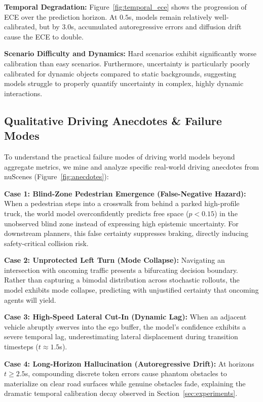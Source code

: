 \textbf{Temporal Degradation:} Figure~\ref{fig:temporal_ece} shows the progression of ECE over the prediction horizon. At $0.5$s, models remain relatively well-calibrated, but by $3.0$s, accumulated autoregressive errors and diffusion drift cause the ECE to double.

\textbf{Scenario Difficulty and Dynamics:} Hard scenarios exhibit significantly worse calibration than easy scenarios. Furthermore, uncertainty is particularly poorly calibrated for dynamic objects compared to static backgrounds, suggesting models struggle to properly quantify uncertainty in complex, highly dynamic interactions.

\subsection{Qualitative Driving Anecdotes \& Failure Modes}
\label{sec:anecdotes}
To understand the practical failure modes of driving world models beyond aggregate metrics, we mine and analyze specific real-world driving anecdotes from nuScenes (Figure~\ref{fig:anecdotes}):

\textbf{Case 1: Blind-Zone Pedestrian Emergence (False-Negative Hazard):} When a pedestrian steps into a crosswalk from behind a parked high-profile truck, the world model overconfidently predicts free space ($p < 0.15$) in the unobserved blind zone instead of expressing high epistemic uncertainty. For downstream planners, this false certainty suppresses braking, directly inducing safety-critical collision risk.

\textbf{Case 2: Unprotected Left Turn (Mode Collapse):} Navigating an intersection with oncoming traffic presents a bifurcating decision boundary. Rather than capturing a bimodal distribution across stochastic rollouts, the model exhibits mode collapse, predicting with unjustified certainty that oncoming agents will yield.

\textbf{Case 3: High-Speed Lateral Cut-In (Dynamic Lag):} When an adjacent vehicle abruptly swerves into the ego buffer, the model's confidence exhibits a severe temporal lag, underestimating lateral displacement during transition timesteps ($t \approx 1.5$s).

\textbf{Case 4: Long-Horizon Hallucination (Autoregressive Drift):} At horizons $t \ge 2.5$s, compounding discrete token errors cause phantom obstacles to materialize on clear road surfaces while genuine obstacles fade, explaining the dramatic temporal calibration decay observed in Section~\ref{sec:experiments}.

